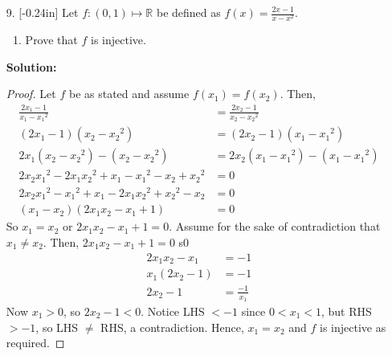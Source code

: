 \documentclass[letterpaper,12pt]{article}
\theoremstyle{definition}
\begin{document}
\pagebreak
\begin{enumerate}
    \item[9.] \reversemarginpar{}[-0.24in] 
    Let $f:(0,1) \mapsto \mathbb{R}$ be defined as $f(x) = \frac{2x-1}{x-x^2}$. \begin{enumerate}
        \item Prove that $f$ is injective.
    \end{enumerate}
    \begin{mdframed}
            \textbf{Solution:}
            \begin{proof}
              Let $f$ be as stated and assume $f(x_1) = f(x_2)$. Then, \begin{align*}
                  \frac{2x_1-1}{x_1-{x_1}^2} &= \frac{2x_2-1}{x_2-{x_2}^2} \\
                  (2x_1-1)(x_2-{x_2}^2) &= (2x_2-1)(x_1-{x_1}^2) \\
                  2x_1(x_2-{x_2}^2) - (x_2-{x_2}^2) &= 2x_2(x_1-{x_1}^2) - (x_1-{x_1}^2) \\
                  2x_2{x_1}^2 - 2x_1{x_2}^2 + x_1-{x_1}^2 - x_2+{x_2}^2 &= 0 \\
                  2x_2{x_1}^2 -{x_1}^2  + x_1 - 2x_1{x_2}^2 +{x_2}^2  - x_2 &= 0 \\
                  (x_1 - x_2)(2x_1x_2 - x_1 + 1) &= 0
              \end{align*}
              So $x_1 = x_2$ or $2x_1x_2 - x_1 + 1 = 0$. Assume for the sake of contradiction that $x_1 \neq x_2$. Then, $2x_1x_2 - x_1 + 1 = 0$ s0 \begin{align*}
                  2x_1x_2 - x_1 &= -1 \\
                  x_1(2x_2 - 1) &= -1 \\
                  2x_2 - 1 &= \frac{-1}{x_1}
              \end{align*}
              Now $x_1 >0$, so $2x_2 - 1 < 0$. Notice LHS $< -1$ since $0 < x_1 < 1$, but RHS $> -1$, so LHS $\neq$ RHS, a contradiction. Hence, $x_1 = x_2$ and $f$ is injective as required.
            \end{proof}
        \end{mdframed}
\end{enumerate}
\pagebreak
\end{document}
